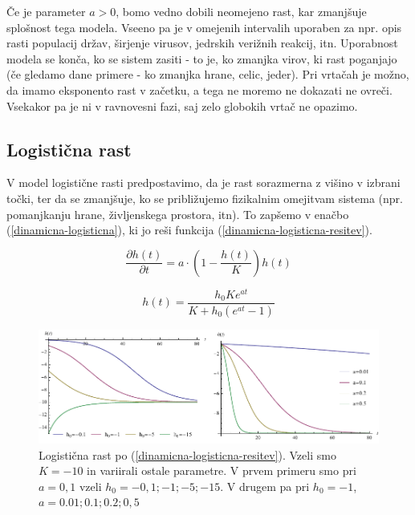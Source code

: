 \documentclass[a4paper, twoside, 12pt]{book}
\begin{document}
          Če je parameter $a > 0$, bomo vedno dobili neomejeno rast, kar zmanjšuje splošnost tega modela. Vseeno pa je v omejenih intervalih uporaben za npr. opis rasti populacij držav, širjenje virusov, jedrskih verižnih reakcij, itn. Uporabnost modela se konča, ko se sistem zasiti - to je, ko zmanjka virov, ki rast poganjajo (če gledamo dane primere - ko zmanjka hrane, celic, jeder).
          Pri vrtačah je možno, da imamo eksponento rast v začetku, a tega ne moremo ne dokazati ne ovreči. Vsekakor pa je ni v ravnovesni fazi, saj zelo globokih vrtač ne opazimo.


          \subsection{Logistična rast}

          V model logistične rasti predpostavimo, da je rast sorazmerna z višino v izbrani točki, ter da se zmanjšuje, ko se približujemo fizikalnim omejitvam sistema (npr. pomanjkanju hrane, življenskega prostora, itn). To zapšemo v enačbo (\ref{dinamicna-logisticna}), ki jo reši funkcija (\ref{dinamicna-logisticna-resitev}).

          \begin{equation}
            \frac{\partial h(t)}{\partial t} = a \cdot \left( 1 - \frac{h(t)}{K} \right) h(t)
            \label{dinamicna-logisticna}
          \end{equation}

            \begin{equation}
            h(t) = \frac{h_0 K e^{a t}}{K + h_0 (e^{a t}-1)}
            \label{dinamicna-logisticna-resitev}
          \end{equation}

            \begin{figure}[h]
              \begin{center}
                \includegraphics[width=14cm]{slike/logisticna-rast}
              \end{center}
              \caption{Logistična rast po (\ref{dinamicna-logisticna-resitev}). Vzeli smo $K=-10$ in variirali ostale parametre. V prvem primeru smo pri $a=0,1$ vzeli $h_0=-0,1;-1;-5;-15$. V drugem pa pri $h_0=-1$, $a=0.01;0.1;0.2;0,5$}
              \label{fig:logisticna-rast}
            \end{figure}
\end{document}
